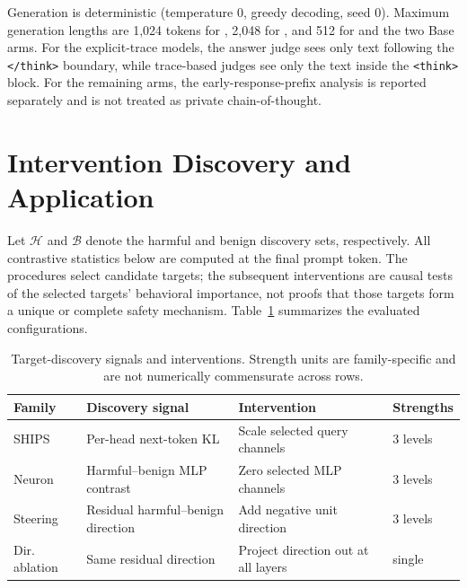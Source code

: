 Generation is deterministic (temperature $0$, greedy decoding, seed $0$).
Maximum generation lengths are 1,024 tokens for , 2,048 for
, and 512 for  and the two Base arms.
For the explicit-trace models, the answer judge sees only text following the
\texttt{</think>} boundary, while trace-based judges see only the text inside
the \texttt{<think>} block. For the remaining arms, the early-response-prefix
analysis is reported separately and is not treated as private chain-of-thought.

\section{Intervention Discovery and Application}
\label{sec:appendix-methods}

Let $\mathcal{H}$ and $\mathcal{B}$ denote the harmful and benign discovery
sets, respectively. All contrastive statistics below are computed at the final
prompt token. The procedures select candidate targets; the subsequent
interventions are causal tests of the selected targets' behavioral importance,
not proofs that those targets form a unique or complete safety mechanism.
Table~\ref{tab:appendix-interventions} summarizes the evaluated configurations.

\begin{table}[t]
  \centering
  \scriptsize
  \setlength{\tabcolsep}{2.5pt}
  \begin{tabular}{@{}p{}p{}p{}p{}@{}}
    \toprule
    \textbf{Family} & \textbf{Discovery signal} & \textbf{Intervention} & \textbf{Strengths} \\
    \midrule
    SHIPS & Per-head next-token KL & Scale selected query channels & 3 levels \\
    Neuron & Harmful--benign MLP contrast & Zero selected MLP channels & 3 levels \\
    Steering & Residual harmful--benign direction & Add negative unit direction & 3 levels \\
    Dir. ablation & Same residual direction & Project direction out at all layers & single \\
    \bottomrule
  \end{tabular}
  \caption{Target-discovery signals and interventions. Strength units are
  family-specific and are not numerically commensurate across rows.}
  \label{tab:appendix-interventions}
\end{table}

